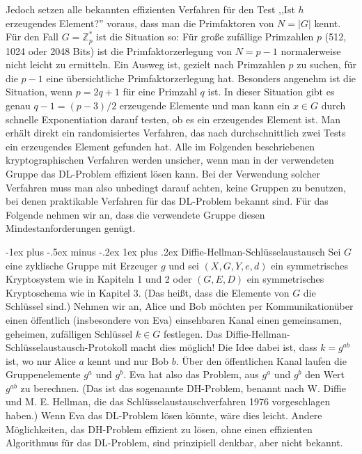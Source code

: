\documentclass[a4paper]{article}
\makeatletter
\renewcommand{\subsubsection}{\@startsection{subsubsection}{3}{0mm}%
 {-1ex plus -.5ex minus -.2ex}%
 {1ex plus .2ex}%
 {\normalfont\small\bfseries}}
\makeatother
\begin{document}
\begin{multicols}{3}
        Jedoch setzen alle bekannten effizienten Verfahren für den Test ,,Ist $h$ erzeugendes Element?'' voraus, dass man die Primfaktoren von $N=|G|$ kennt.
        Für den Fall $G=\mathbb{Z}^*_p$ ist die Situation so: Für große zufällige Primzahlen $p$ (512, 1024 oder 2048 Bits) ist die Primfaktorzerlegung von $N=p-1$ normalerweise nicht leicht zu ermitteln. Ein Ausweg ist, gezielt nach Primzahlen $p$ zu suchen, für die $p-1$ eine übersichtliche Primfaktorzerlegung hat. Besonders angenehm ist die Situation, wenn $p=2q+1$ für eine Primzahl $q$ ist.
        In dieser Situation gibt es genau $q-1=(p-3)/2$ erzeugende Elemente und man kann ein $x\in G$ durch schnelle Exponentiation darauf testen, ob es ein erzeugendes Element ist. Man erhält direkt ein randomisiertes Verfahren, das nach durchschnittlich zwei Tests ein erzeugendes Element gefunden hat.
        Alle im Folgenden beschriebenen kryptographischen Verfahren werden unsicher, wenn man in der verwendeten Gruppe das DL-Problem effizient lösen kann. Bei der Verwendung solcher Verfahren muss man also unbedingt darauf achten, keine Gruppen zu benutzen, bei denen praktikable Verfahren für das DL-Problem bekannt sind.
        Für das Folgende nehmen wir an, dass die verwendete Gruppe diesen Mindestanforderungen genügt.

        \subsubsection{Diffie-Hellman-Schlüsselaustausch}
        Sei $G$ eine zyklische Gruppe mit Erzeuger $g$ und sei $(X,G,Y,e,d)$ ein symmetrisches Kryptosystem wie in Kapiteln 1 und 2 oder $(G,E,D)$ ein symmetrisches Kryptoschema wie in Kapitel 3. (Das heißt, dass die Elemente von $G$ die Schlüssel sind.) Nehmen wir an, Alice und Bob möchten per Kommunikationüber einen öffentlich (insbesondere von Eva) einsehbaren Kanal einen gemeinsamen, geheimen, zufälligen Schlüssel $k\in G$ festlegen. Das Diffie-Hellman-Schlüsselaustausch-Protokoll macht dies möglich!
        Die Idee dabei ist, dass $k=g^{ab}$ ist, wo nur Alice $a$ kennt und nur Bob $b$. Über den öffentlichen Kanal laufen die Gruppenelemente $g^a$ und $g^b$. Eva hat also das Problem, aus $g^a$ und $g^b$ den Wert $g^{ab}$ zu berechnen. (Das ist das sogenannte DH-Problem,
        benannt nach W. Diffie und M. E. Hellman, die das Schlüsselaustauschverfahren 1976 vorgeschlagen haben.) Wenn Eva das DL-Problem lösen könnte, wäre dies leicht. Andere Möglichkeiten, das DH-Problem effizient zu lösen, ohne einen effizienten Algorithmus für das DL-Problem, sind prinzipiell denkbar, aber nicht bekannt.


\end{multicols}
\end{document}

